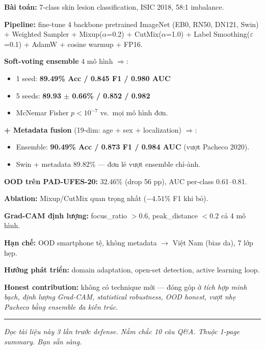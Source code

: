 \documentclass[11pt,a4paper]{article}
\begin{document}
\begin{idea}
\textbf{Bài toán:} 7-class skin lesion classification, ISIC 2018, 58:1 imbalance.

\textbf{Pipeline:} fine-tune 4 backbone pretrained ImageNet (EB0, RN50, DN121, Swin) + Weighted Sampler + Mixup($\alpha$=0.2) + CutMix($\alpha$=1.0) + Label Smoothing($\varepsilon$=0.1) + AdamW + cosine warmup + FP16.

\textbf{Soft-voting ensemble} 4 mô hình $\Rightarrow$:
\begin{itemize}[leftmargin=*]
  \item 1 seed: \textbf{89.49\% Acc / 0.845 F1 / 0.980 AUC}
  \item 5 seeds: \textbf{89.93 $\pm$ 0.66\% / 0.852 / 0.982}
  \item McNemar Fisher $p < 10^{-7}$ vs.\ mọi mô hình đơn.
\end{itemize}

\textbf{+ Metadata fusion} (19-dim: age + sex + localization) $\Rightarrow$:
\begin{itemize}[leftmargin=*]
  \item Ensemble: \textbf{90.49\% Acc / 0.873 F1 / 0.984 AUC} (vượt Pacheco 2020).
  \item Swin + metadata 89.82\% --- đơn lẻ vượt ensemble chỉ-ảnh.
\end{itemize}

\textbf{OOD trên PAD-UFES-20:} 32.46\% (drop 56 pp), AUC per-class 0.61--0.81.

\textbf{Ablation:} Mixup/CutMix quan trọng nhất ($-4.51\%$ F1 khi bỏ).

\textbf{Grad-CAM định lượng:} focus\_ratio $> 0.6$, peak\_distance $< 0.2$ cả 4 mô hình.

\textbf{Hạn chế:} OOD smartphone tệ, không metadata $\to$ Việt Nam (bias da), 7 lớp hẹp.

\textbf{Hướng phát triển:} domain adaptation, open-set detection, active learning loop.

\textbf{Honest contribution:} không có technique mới --- đóng góp ở \textit{tích hợp minh bạch, định lượng Grad-CAM, statistical robustness, OOD honest, vượt nhẹ Pacheco bằng ensemble đa kiến trúc}.
\end{idea}

\vspace{12pt}
\hrule
\vspace{6pt}
\begin{center}
\small \textit{Đọc tài liệu này 3 lần trước defense. Nắm chắc 10 câu Q\&A. Thuộc 1-page summary. Bạn sẵn sàng.}
\end{center}
\end{document}
